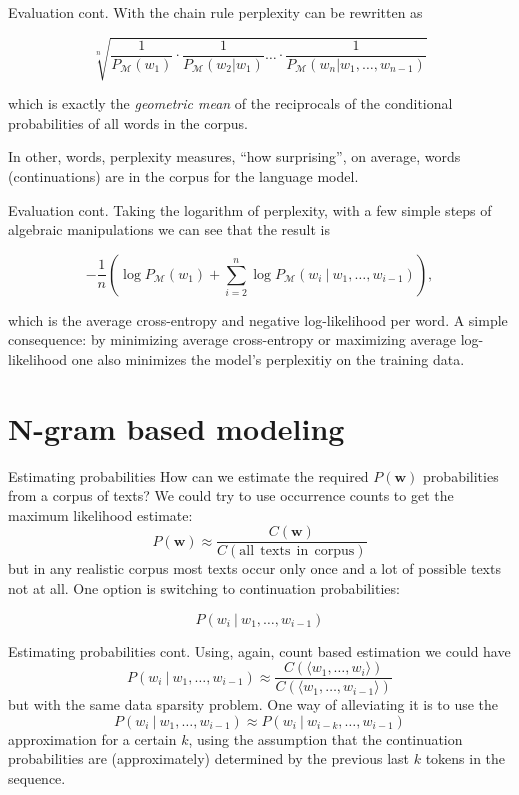 \documentclass[style=upen, size=14pt]{powerdot}
\theoremstyle{definition}
\begin{document}
\begin{slide}[toc=]{Evaluation cont.}
  With the chain rule perplexity can be rewritten as

$${\sqrt[n]{\frac{1}{P_{\mathcal M}(w_1)}\cdot \frac{1}{P_{\mathcal M}(w_2 \vert w_1 )}\dots\cdot \frac{1}{P_{\mathcal M}(w_n\vert w_1,\dots, w_{n-1})}}}$$

which is exactly the \emph{geometric mean} of the reciprocals of the conditional
probabilities of all words in the corpus.\bigskip

In other, words, perplexity measures, ``how surprising'', on average, words
(continuations) are in the corpus for the language model.
\end{slide}

\begin{slide}[toc=]{Evaluation cont.}
  Taking the logarithm of perplexity, with a few simple steps of algebraic
  manipulations we can see that the result is

  $$
  - \frac{1}{n} \left(\log P_{\mathcal M}(w_1) + \sum_{i=2}^n\log P_{\mathcal M}(w_i ~\vert~ w_1,\dots, w_{i-1})\right),
$$

which is the average cross-entropy and negative log-likelihood per word. A
simple consequence: by minimizing average cross-entropy or maximizing average
log-likelihood one also minimizes the model's perplexitiy on the training data.
\end{slide}

\section{N-gram based modeling}

\begin{slide}[toc=Estimating probabilities]{Estimating  probabilities}
  How can we estimate the required $P(\mathbf{w})$ probabilities from a corpus
  of texts? We could try to use occurrence counts to get the maximum likelihood estimate:
  $$
  P(\mathbf{w}) \approx \frac{C(\mathbf{w})}{C(\mathrm{all~~texts~~in~~corpus})}
  $$
  but in any realistic corpus most texts occur only once and a lot of possible
  texts not at all. One option is switching to continuation probabilities: 
  
  $$
  P(w_{i} ~\vert~ w_1,\dots,w_{i-1})
  $$
\end{slide}

\begin{slide}[toc=]{Estimating  probabilities cont.}
  Using, again, count based estimation we could have
  $$
  P(w_{i} ~\vert~ w_1,\dots,w_{i-1}) \approx
  \frac{C(\langle w_1,\dots,w_{i} \rangle)}{C(\langle w_1,\dots,w_{i-1} \rangle
    )}
  $$
  but with the same data sparsity problem. One way of alleviating it is to use
  the
  $$
  P(w_{i} ~\vert~ w_1,\dots,w_{i-1}) \approx P(w_{i} ~\vert~
  w_{i-k},\dots,w_{i-1})
  $$
  approximation for a certain $k$, using the assumption that the continuation
  probabilities are (approximately) determined by the previous last $k$ tokens
  in the sequence.
\end{slide}
\end{document}
